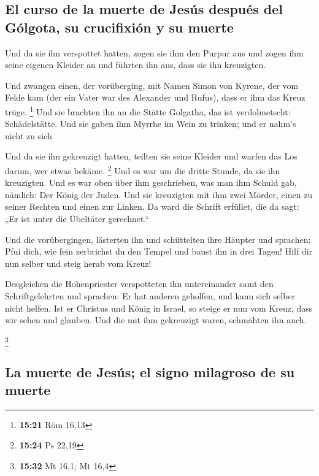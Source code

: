 \hypertarget{el-curso-de-la-muerte-de-jesuxfas-despuuxe9s-del-guxf3lgota-su-crucifixiuxf3n-y-su-muerte}{%
\subsection{El curso de la muerte de Jesús después del Gólgota, su
crucifixión y su
muerte}\label{el-curso-de-la-muerte-de-jesuxfas-despuuxe9s-del-guxf3lgota-su-crucifixiuxf3n-y-su-muerte}}

 Und da sie ihn verspottet hatten, zogen sie ihm den
Purpur aus und zogen ihm seine eigenen Kleider an und führten ihn aus,
dass sie ihn kreuzigten.

 Und zwangen einen, der vorüberging, mit Namen Simon von
Kyrene, der vom Felde kam (der ein Vater war des Alexander und Rufus),
dass er ihm das Kreuz trüge. \footnote{\textbf{15:21} Röm 16,13}
 Und sie brachten ihn an die Stätte Golgatha, das ist
verdolmetscht: Schädelstätte.  Und sie gaben ihm Myrrhe
im Wein zu trinken; und er nahm's nicht zu sich.

 Und da sie ihn gekreuzigt hatten, teilten sie seine
Kleider und warfen das Los darum, wer etwas bekäme. \footnote{\textbf{15:24}
  Ps 22,19}  Und es war um die dritte Stunde, da sie ihn
kreuzigten.  Und es war oben über ihm geschrieben, was
man ihm Schuld gab, nämlich: Der König der Juden.  Und
sie kreuzigten mit ihm zwei Mörder, einen zu seiner Rechten und einen
zur Linken.  Da ward die Schrift erfüllet, die da sagt:
„Er ist unter die Übeltäter gerechnet.``

 Und die vorübergingen, lästerten ihn und schüttelten
ihre Häupter und sprachen: Pfui dich, wie fein zerbrichst du den Tempel
und baust ihn in drei Tagen!  Hilf dir nun selber und
steig herab vom Kreuz!

 Desgleichen die Hohenpriester verspotteten ihn
untereinander samt den Schriftgelehrten und sprachen: Er hat anderen
geholfen, und kann sich selber nicht helfen.  Ist er
Christus und König in Israel, so steige er nun vom Kreuz, dass wir sehen
und glauben. Und die mit ihm gekreuzigt waren, schmähten ihn auch.

\footnote{\textbf{15:32} Mt 16,1; Mt 16,4}

\hypertarget{la-muerte-de-jesuxfas-el-signo-milagroso-de-su-muerte}{%
\subsection{La muerte de Jesús; el signo milagroso de su
muerte}\label{la-muerte-de-jesuxfas-el-signo-milagroso-de-su-muerte}}

